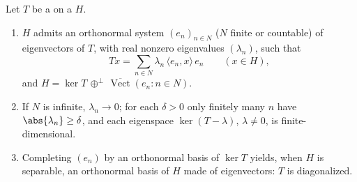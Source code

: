 \begin{theorem}\label{thm:b3:spectral:spectral}
Let $T$ be a   on a 
$H$.
\begin{enumerate}
  \item $H$ admits an orthonormal system $(e_n)_{n \in N}$
        ($N$ finite or countable) of eigenvectors of $T$, with
        real nonzero eigenvalues $(\lambda_n)$, such that
        \[
        Tx = \sum_{n\in N}\lambda_n\,\langle e_n, x\rangle\,
        e_n \qquad (x \in H),
        \]
        and $H = \ker T \,\oplus^\perp\,
        \overline{\operatorname{Vect}}(e_n : n \in N)$.
  \item If $N$ is infinite, $\lambda_n \to 0$; for each
        $\delta > 0$ only finitely many $n$ have
        $\abs{\lambda_n} \geq \delta$, and each eigenspace
        $\ker(T - \lambda)$, $\lambda \neq 0$, is
        finite-dimensional.
  \item Completing $(e_n)$ by an orthonormal basis of $\ker T$
        yields, when $H$ is separable, an orthonormal basis of
        $H$ made of eigenvectors: $T$ is diagonalized.
\end{enumerate}
\end{theorem}

